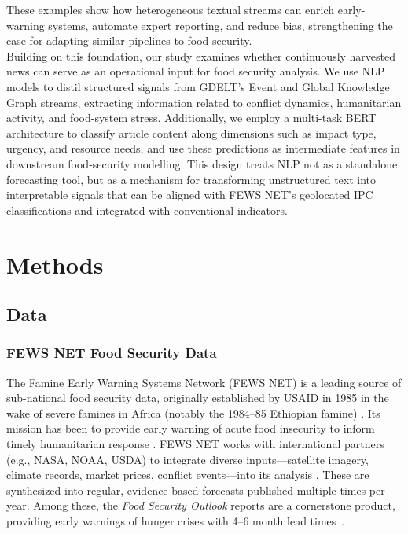 \documentclass{article}
\begin{document}
These examples show how heterogeneous textual streams can enrich early-warning systems, automate expert reporting, and reduce bias, strengthening the case for adapting similar pipelines to food security.\\

Building on this foundation, our study examines whether continuously harvested news can serve as an operational input for food security analysis. We use NLP models to distil structured signals from GDELT’s Event and Global Knowledge Graph streams, extracting information related to conflict dynamics, humanitarian activity, and food-system stress. Additionally, we employ a multi-task BERT architecture to classify article content along dimensions such as impact type, urgency, and resource needs, and use these predictions as intermediate features in downstream food-security modelling. This design treats NLP not as a standalone forecasting tool, but as a mechanism for transforming unstructured text into interpretable signals that can be aligned with FEWS NET’s geolocated IPC classifications and integrated with conventional indicators.



\section{Methods}
\subsection{Data}

\subsubsection{FEWS NET Food Security Data}\label{sec:fewsnet_data}

The Famine Early Warning Systems Network (FEWS NET) is a leading source of sub-national food security data, originally established by USAID in 1985 in the wake of severe famines in Africa (notably the 1984–85 Ethiopian famine) \citep{spitzer2025respected}. Its mission has been to provide early warning of acute food insecurity to inform timely humanitarian response \citep{knibbs2025usaid}. FEWS NET works with international partners (e.g., NASA, NOAA, USDA) to integrate diverse inputs—satellite imagery, climate records, market prices, conflict events—into its analysis \citep{fewsnet2023ipc}. These are synthesized into regular, evidence-based forecasts published multiple times per year. Among these, the \textit{Food Security Outlook} reports are a cornerstone product, providing early warnings of hunger crises with 4–6 month lead times~\citep{backer2021validating}.
\end{document}
